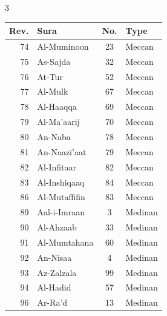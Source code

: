 \documentclass{article}
\begin{document}
\begin{center}
\begin{multicols}{3}
        \begin{threeparttable}
            \begin{tabular}{@{}r l c l@{}}
                \textbf{Rev.} & \textbf{Sura}         & \textbf{No.} & \textbf{Type} \\
                \hline
                74            & Al-Muminoon           & 23           & Meccan        \\
                75            & As-Sajda\tnote{31}    & 32           & Meccan        \\
                76            & At-Tur                & 52           & Meccan        \\
                77            & Al-Mulk               & 67           & Meccan        \\
                78            & Al-Haaqqa             & 69           & Meccan        \\
                79            & Al-Ma'aarij           & 70           & Meccan        \\
                80            & An-Naba               & 78           & Meccan        \\
                81            & An-Naazi'aat          & 79           & Meccan        \\
                82            & Al-Infitaar           & 82           & Meccan        \\
                83            & Al-Inshiqaaq          & 84           & Meccan        \\
                86            & Al-Mutaffifin         & 83           & Meccan        \\
                89            & Aal-i-Imraan          & 3            & Medinan       \\
                90            & Al-Ahzaab             & 33           & Medinan       \\
                91            & Al-Mumtahana          & 60           & Medinan       \\
                92            & An-Nisaa              & 4            & Medinan       \\
                93            & Az-Zalzala            & 99           & Medinan       \\
                94            & Al-Hadid              & 57           & Medinan       \\
                96            & Ar-Ra'd               & 13           & Medinan       \\

\end{tabular}
\end{threeparttable}
\end{multicols}
\end{center}
\end{document}
